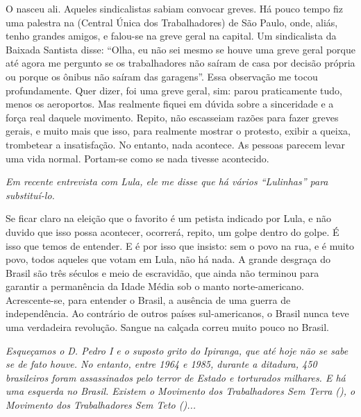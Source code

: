 \normalfont
O  nasceu ali. Aqueles sindicalistas sabiam convocar
greves. Há pouco tempo fiz uma palestra na  (Central Única dos
Trabalhadores) de São Paulo, onde, aliás, tenho grandes amigos, e
falou-se na greve geral na capital. Um sindicalista da Baixada Santista
disse: ``Olha, eu não sei mesmo se houve uma greve geral porque até
agora me pergunto se os trabalhadores não saíram de casa por decisão
própria ou porque os ônibus não saíram das garagens''. Essa observação
me tocou profundamente. Quer dizer, foi uma greve geral, sim: parou
praticamente tudo, menos os aeroportos. Mas realmente fiquei em dúvida
sobre a sinceridade e a força real daquele movimento. Repito, não
escasseiam razões para fazer greves gerais, e muito mais que isso, para
realmente mostrar o protesto, exibir a queixa, trombetear a
insatisfação. No entanto, nada acontece. As pessoas parecem levar uma
vida normal. Portam-se como se nada tivesse acontecido.

\itshape
 Em recente entrevista com Lula, ele me disse que há
vários ``Lulinhas'' para substituí-lo.

\normalfont
Se ficar claro na eleição que o favorito é um petista
indicado por Lula, e não duvido que isso possa acontecer, ocorrerá,
repito, um golpe dentro do golpe. É isso que temos de entender. E é por
isso que insisto: sem o povo na rua, e é muito povo, todos aqueles que
votam em Lula, não há nada. A grande desgraça do Brasil são três séculos
e meio de escravidão, que ainda não terminou para garantir a permanência
da Idade Média sob o manto norte-americano. Acrescente-se, para entender
o Brasil, a ausência de uma guerra de independência. Ao contrário de
outros países sul-americanos, o Brasil nunca teve uma verdadeira
revolução. Sangue na calçada correu muito pouco no Brasil.

\itshape
 Esqueçamos o D. Pedro I e o suposto grito do Ipiranga,
que até hoje não se sabe se de fato houve. No entanto, entre 1964 e
1985, durante a ditadura, 450 brasileiros foram assassinados pelo terror
de Estado e torturados milhares. E há uma esquerda no Brasil. Existem o
Movimento dos Trabalhadores Sem Terra (), o Movimento dos
Trabalhadores Sem Teto ()...

